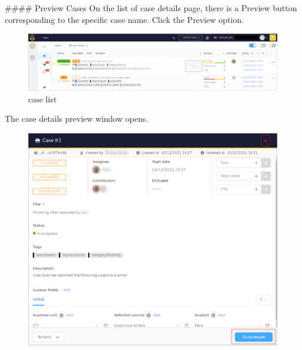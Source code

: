 


\begin{markdown}
#### Preview Cases
On the list of case details page, there is a Preview button corresponding to the specific case name. Click the Preview option.
\end{markdown}

\begin{figure}[H]
    \centering
    \includegraphics[width=\textwidth]{images/docs/analyst/cases/preview/cases-list-preview-button.png}
    \caption{case list}
    \label{fig:modules}
\end{figure}

\begin{markdown}

The case details preview window opens.
\end{markdown}



\begin{figure}[H]
    \centering
    \includegraphics[width=\textwidth]    {images/docs/analyst/cases/preview/cases-list-preview-details.png}
    \label{fig:modules}
\end{figure}

